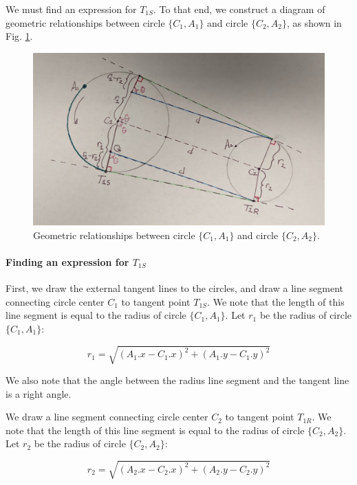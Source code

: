 \documentclass{article}
\begin{document}
We must find an expression for $T_{1S}$. To that end, we construct a diagram of geometric relationships between circle $\{C_1, A_1\}$ and circle $\{C_2, A_2\}$, as shown in Fig. \ref{fig:SLR_Primary}.

\begin{figure}
    \centering
    \includegraphics[width=1.0\textwidth]{SLRPrimary.png}
    \caption{Geometric relationships between circle $\{C_1, A_1\}$ and circle $\{C_2, A_2\}$.}
    \label{fig:SLR_Primary}
\end{figure}

\paragraph{Finding an expression for $T_{1S}$}
First, we draw the external tangent lines to the circles, and draw a line segment connecting circle center $C_1$ to tangent point $T_{1S}$. We note that the length of this line segment is equal to the radius of circle $\{C_1, A_1\}$. Let $r_1$ be the radius of circle $\{C_1, A_1\}$:

\begin{equation}
    \label{eq:r_1}
    r_1 = \sqrt{(A_1.x - C_1.x)^2 + (A_1.y - C_1.y)^2}
\end{equation}

We also note that the angle between the radius line segment and the tangent line is a right angle.

We draw a line segment connecting circle center $C_2$ to tangent point $T_{1R}$. We note that the length of this line segment is equal to the radius of circle $\{C_2, A_2\}$. Let $r_2$ be the radius of circle $\{C_2, A_2\}$:

\begin{equation}
    \label{eq:r_2}
r_2 = \sqrt{(A_2.x - C_2.x)^2 + (A_2.y - C_2.y)^2}
\end{equation}
\end{document}
